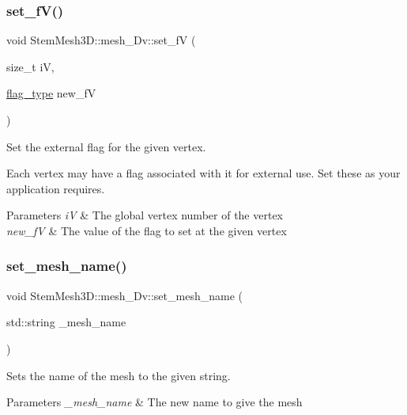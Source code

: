 \subsubsection{\texorpdfstring{set\+\_\+f\+V()}{set\_fV()}}
{\footnotesize\ttfamily void Stem\+Mesh3\+D\+::mesh\+\_\+Dv\+::set\+\_\+fV (\begin{DoxyParamCaption}\item[{size\+\_\+t}]{iV,  }\item[{\hyperlink{classStemMesh3D_1_1mesh__3Dv_a9544cba555b60f17f04fcd1689314338}{flag\+\_\+type}}]{new\+\_\+fV }\end{DoxyParamCaption})}



Set the external flag for the given vertex. 

Each vertex may have a flag associated with it for external use. Set these as your application requires. 
\begin{DoxyParams}{Parameters}
{\em iV} & The global vertex number of the vertex \\
\hline
{\em new\+\_\+fV} & The value of the flag to set at the given vertex \\
\hline
\end{DoxyParams}
\mbox{\label{classStemMesh3D_1_1mesh__3Dv_ac40eb6e8236253c78ce71c0fd876d539}} 
\subsubsection{\texorpdfstring{set\+\_\+mesh\+\_\+name()}{set\_mesh\_name()}}
{\footnotesize\ttfamily void Stem\+Mesh3\+D\+::mesh\+\_\+Dv\+::set\+\_\+mesh\+\_\+name (\begin{DoxyParamCaption}\item[{std\+::string}]{\+\_\+mesh\+\_\+name }\end{DoxyParamCaption})}



Sets the name of the mesh to the given string. 


\begin{DoxyParams}{Parameters}
{\em \+\_\+mesh\+\_\+name} & The new name to give the mesh \\
\hline
\end{DoxyParams}
\mbox{\label{classStemMesh3D_1_1mesh__3Dv_a93fff194e371aa21a00f0e5e1e6d45cd}} 
